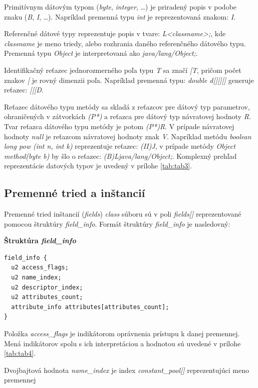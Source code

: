 \documentclass[11pt,final,oneside]{fithesis}
\newenvironment{example}[1]
{
\vspace{3mm}
\noindent\textbf{#1}
\vspace{2mm}
}
{
\vspace{3mm}
}
\begin{document}
Primitívnym dátovým typom (\textit{byte}, \textit{integer}, …) je priradený
popis v podobe znaku (\textit{B}, \textit{I}, …). Napríklad premenná typu
\textit{int} je reprezentovaná znakom: \textit{I}.

Referenčné dátové typy reprezentuje popis v tvare: \textit{L<classname>;}, kde 
\textit{classname} je meno triedy, alebo rozhrania daného referenčného
dátového typu. Premenná typu \textit{Object} je interpretovaná ako
\textit{java/lang/Object;}. 

Identifikačný reťazec jednorozmerného poľa typu \textit{T} sa značí
\textit{[T}, pričom počet znakov \textit{[} je rovný dimenzii poľa. Napríklad
premenná typu: \textit{double d[][][]} generuje reťazec: \textit{[[[D}.

Reťazec dátového typu metódy sa skladá z reťazcov pre dátový typ parametrov,
ohraničených v zátvorkách \textit{(P*)} a reťazca pre dátový typ návratovej
hodnoty \textit{R}. Tvar reťazca dátového typu metódy je potom \textit{(P*)R}.
V prípade návratovej hodnoty \textit{null} je reťazcom návratovej hodnoty znak
\textit{V}. Napríklad metódu \textit{boolean long pow (int n, int k)}
reprezentuje reťazec: \textit{(II)J}, v prípade metódy
\textit{Object method(byte b)} by šlo o reťazec:
\textit{(B)Ljava/lang/Object;}. Komplexný prehľad reprezentácie datových typov
je uvedený v prílohe \ref{tab:tab3}.

\subsection{Premenné tried a inštancií}
\label{sec:fields}
Premenné tried inštancií (\textit{fields}) \textit{class} súboru sú v poli
\textit{fields[]} reprezentované pomocou štruktúry \textit{field\_info}.
Formát štruktúry \textit{field\_info} je nasledovný:

\begin{example}{Štruktúra \textit{field\_info}}
\begin{verbatim}
field_info {
  u2 access_flags;
  u2 name_index;
  u2 descriptor_index;
  u2 attributes_count;
  attribute_info attributes[attributes_count];
}
\end{verbatim}
\end{example}

Položka \textit{access\_flags} je indikátorom oprávnenia prístupu k danej
premennej. Mená indikátorov spolu s ich interpretáciou a hodnotou sú uvedené v
prílohe \ref{tab:tab4}.
     
Dvojbajtová hodnota \textit{name\_index} je index \textit{constant\_pool[]}
reprezentujúci meno premennej
\end{document}
